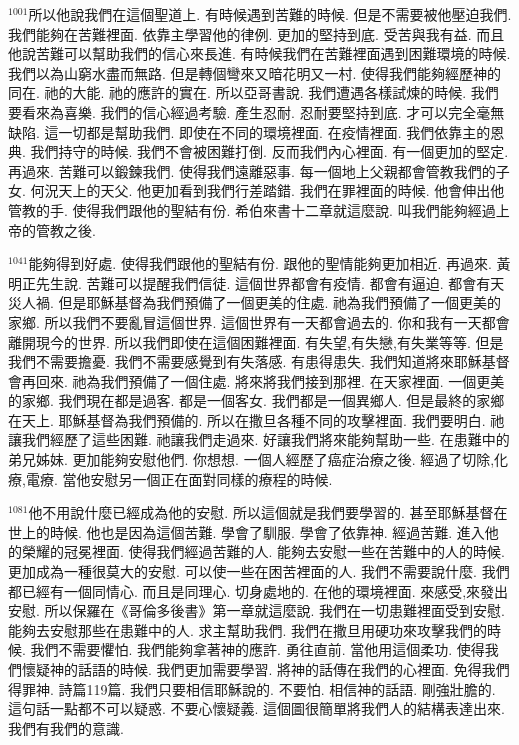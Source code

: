 \documentclass{book}
\begin{document}
$^{1001}$所以他說我們在這個聖道上.
有時候遇到苦難的時候.
但是不需要被他壓迫我們.
我們能夠在苦難裡面.
依靠主學習他的律例.
更加的堅持到底.
受苦與我有益.
而且他說苦難可以幫助我們的信心來長進.
有時候我們在苦難裡面遇到困難環境的時候.
我們以為山窮水盡而無路.
但是轉個彎來又暗花明又一村.
使得我們能夠經歷神的同在.
祂的大能.
祂的應許的實在.
所以亞哥書說.
我們遭遇各樣試煉的時候.
我們要看來為喜樂.
我們的信心經過考驗.
產生忍耐.
忍耐要堅持到底.
才可以完全毫無缺陷.
這一切都是幫助我們.
即使在不同的環境裡面.
在疫情裡面.
我們依靠主的恩典.
我們持守的時候.
我們不會被困難打倒.
反而我們內心裡面.
有一個更加的堅定.
再過來.
苦難可以鍛鍊我們.
使得我們遠離惡事.
每一個地上父親都會管教我們的子女.
何況天上的天父.
他更加看到我們行差踏錯.
我們在罪裡面的時候.
他會伸出他管教的手.
使得我們跟他的聖結有份.
希伯來書十二章就這麼說.
叫我們能夠經過上帝的管教之後.

$^{1041}$能夠得到好處.
使得我們跟他的聖結有份.
跟他的聖情能夠更加相近.
再過來.
黃明正先生說.
苦難可以提醒我們信徒.
這個世界都會有疫情.
都會有逼迫.
都會有天災人禍.
但是耶穌基督為我們預備了一個更美的住處.
祂為我們預備了一個更美的家鄉.
所以我們不要亂冒這個世界.
這個世界有一天都會過去的.
你和我有一天都會離開現今的世界.
所以我們即使在這個困難裡面.
有失望,有失戀,有失業等等.
但是我們不需要擔憂.
我們不需要感覺到有失落感.
有患得患失.
我們知道將來耶穌基督會再回來.
祂為我們預備了一個住處.
將來將我們接到那裡.
在天家裡面.
一個更美的家鄉.
我們現在都是過客.
都是一個客女.
我們都是一個異鄉人.
但是最終的家鄉在天上.
耶穌基督為我們預備的.
所以在撒旦各種不同的攻擊裡面.
我們要明白.
祂讓我們經歷了這些困難.
祂讓我們走過來.
好讓我們將來能夠幫助一些.
在患難中的弟兄姊妹.
更加能夠安慰他們.
你想想.
一個人經歷了癌症治療之後.
經過了切除,化療,電療.
當他安慰另一個正在面對同樣的療程的時候.

$^{1081}$他不用說什麼已經成為他的安慰.
所以這個就是我們要學習的.
甚至耶穌基督在世上的時候.
他也是因為這個苦難.
學會了馴服.
學會了依靠神.
經過苦難.
進入他的榮耀的冠冕裡面.
使得我們經過苦難的人.
能夠去安慰一些在苦難中的人的時候.
更加成為一種很莫大的安慰.
可以使一些在困苦裡面的人.
我們不需要說什麼.
我們都已經有一個同情心.
而且是同理心.
切身處地的.
在他的環境裡面.
來感受,來發出安慰.
所以保羅在《哥倫多後書》第一章就這麼說.
我們在一切患難裡面受到安慰.
能夠去安慰那些在患難中的人.
求主幫助我們.
我們在撒旦用硬功來攻擊我們的時候.
我們不需要懼怕.
我們能夠拿著神的應許.
勇往直前.
當他用這個柔功.
使得我們懷疑神的話語的時候.
我們更加需要學習.
將神的話傳在我們的心裡面.
免得我們得罪神.
詩篇119篇.
我們只要相信耶穌說的.
不要怕.
相信神的話語.
剛強壯膽的.
這句話一點都不可以疑惑.
不要心懷疑義.
這個圖很簡單將我們人的結構表達出來.
我們有我們的意識.
\end{document}
